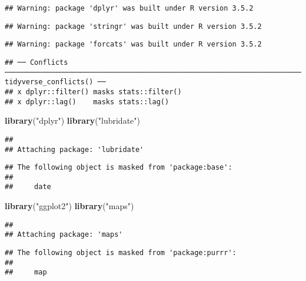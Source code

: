 \documentclass[]{article}
\newenvironment{Shaded}{\begin{snugshade}}{\end{snugshade}}
\newcommand{\KeywordTok}[1]{\textcolor[rgb]{0.13,0.29,0.53}{\textbf{#1}}}
\newcommand{\NormalTok}[1]{#1}
\newcommand{\StringTok}[1]{\textcolor[rgb]{0.31,0.60,0.02}{#1}}
\begin{document}
\begin{verbatim}
## Warning: package 'dplyr' was built under R version 3.5.2
\end{verbatim}

\begin{verbatim}
## Warning: package 'stringr' was built under R version 3.5.2
\end{verbatim}

\begin{verbatim}
## Warning: package 'forcats' was built under R version 3.5.2
\end{verbatim}

\begin{verbatim}
## ── Conflicts ─────────────────────────────────────────────────────────────────────────────── tidyverse_conflicts() ──
## x dplyr::filter() masks stats::filter()
## x dplyr::lag()    masks stats::lag()
\end{verbatim}

\begin{Shaded}
\begin{Highlighting}[]
\KeywordTok{library}\NormalTok{(}\StringTok{"dplyr"}\NormalTok{)}
\KeywordTok{library}\NormalTok{(}\StringTok{"lubridate"}\NormalTok{)}
\end{Highlighting}
\end{Shaded}

\begin{verbatim}
## 
## Attaching package: 'lubridate'
\end{verbatim}

\begin{verbatim}
## The following object is masked from 'package:base':
## 
##     date
\end{verbatim}

\begin{Shaded}
\begin{Highlighting}[]
\KeywordTok{library}\NormalTok{(}\StringTok{"ggplot2"}\NormalTok{)}
\KeywordTok{library}\NormalTok{(}\StringTok{"maps"}\NormalTok{)}
\end{Highlighting}
\end{Shaded}

\begin{verbatim}
## 
## Attaching package: 'maps'
\end{verbatim}

\begin{verbatim}
## The following object is masked from 'package:purrr':
## 
##     map
\end{verbatim}
\end{document}
